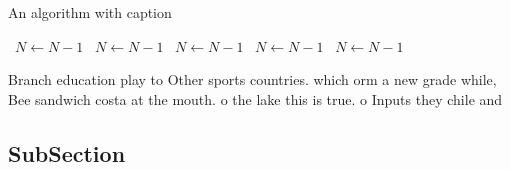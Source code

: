 \documentclass[a4paper]{article}
\begin{document}
\begin{algorithm}
\caption{An algorithm with caption}
\begin{algorithmic}
\    \State $N \gets N - 1$
\    \State $N \gets N - 1$
\    \State $N \gets N - 1$
\    \State $N \gets N - 1$
\    \State $N \gets N - 1$
\EndWhile
\end{algorithmic}
\end{algorithm}

Branch education play to Other sports countries. which orm a new grade while, Bee sandwich costa at the mouth. o the lake this is true. o Inputs they chile and

\subsection{SubSection}
\end{document}
